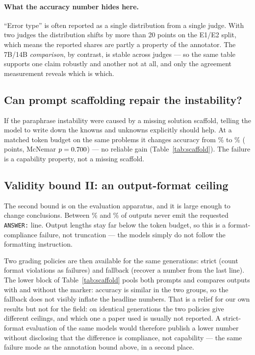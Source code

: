 \documentclass[10pt,letterpaper]{article}
\begin{document}
\paragraph{What the accuracy number hides here.}
``Error type'' is often reported as a single distribution from a single judge. With
two judges the distribution shifts by more than 20 points on the E1/E2 split, which
means the reported shares are partly a property of the annotator. The 7B/14B
\emph{comparison}, by contrast, is stable across judges --- so the same table
supports one claim robustly and another not at all, and only the agreement
measurement reveals which is which.

\subsection{Can prompt scaffolding repair the instability?}
\label{sec:scaffold}
If the paraphrase instability were caused by a missing solution scaffold, telling
the model to write down the knowns and unknowns explicitly should help. At a
matched token budget on the same \nbScafCot{} problems it changes accuracy from
\accScafCot\% to \accScafStruct\% (\scafDeltaPP{} points, McNemar $p=0.700$)
--- no reliable gain (Table~\ref{tab:scaffold}). The failure is a capability
property, not a missing scaffold.



\subsection{Validity bound II: an output-format ceiling}
\label{sec:format}
The second bound is on the evaluation apparatus, and it is large enough to change
conclusions. Between \pctNoAnswerCot\% and \pctNoAnswerStruct\% of outputs never emit
the requested \texttt{ANSWER:} line. Output lengths stay far below the token budget,
so this is a format-compliance failure, not truncation --- the models simply do not
follow the formatting instruction.

Two grading policies are then available for the same generations: strict (count
format violations as failures) and fallback (recover a number from the last line).
The lower block of Table~\ref{tab:scaffold} pools both prompts and compares outputs
with and without the marker: accuracy is similar in the two groups, so the fallback
does not visibly inflate the headline numbers. That is a relief for our own results
but not for the field: on identical generations the two policies give different
ceilings, and which one a paper used is usually not reported. A strict-format
evaluation of the same models would therefore publish a lower number without
disclosing that the difference is compliance, not capability --- the same
failure mode as the annotation bound above, in a second place.
\end{document}
